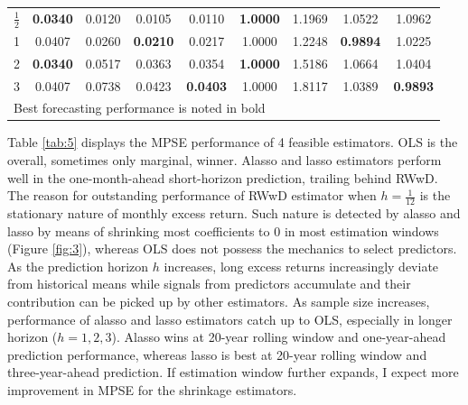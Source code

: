 \documentclass[12pt,a4paper]{article}
\begin{document}
\begin{table}[]
\begin{tabular}{ccccccccc}
\multicolumn{1}{|c|}{$ \frac{1}{2} $}  & \textbf{0.0340} & 0.0120          & 0.0105          & \multicolumn{1}{c|}{0.0110}          & \textbf{1.0000} & 1.1969          & 1.0522          & \multicolumn{1}{c|}{1.0962}          \\
\multicolumn{1}{|c|}{1}                & 0.0407          & 0.0260          & \textbf{0.0210} & \multicolumn{1}{c|}{0.0217}          & 1.0000          & 1.2248          & \textbf{0.9894} & \multicolumn{1}{c|}{1.0225}          \\
\multicolumn{1}{|c|}{2}                & \textbf{0.0340} & 0.0517          & 0.0363          & \multicolumn{1}{c|}{0.0354}          & \textbf{1.0000} & 1.5186          & 1.0664          & \multicolumn{1}{c|}{1.0404}          \\
\multicolumn{1}{|c|}{3}                & 0.0407          & 0.0738          & 0.0423          & \multicolumn{1}{c|}{\textbf{0.0403}} & 1.0000          & 1.8117          & 1.0389          & \multicolumn{1}{c|}{\textbf{0.9893}} \\ \hline
\multicolumn{9}{l}{Best forecasting performance is noted in bold}                                                                                                                                                               
\end{tabular}
\end{table}

Table \ref{tab:5} displays the MPSE performance of 4 feasible estimators. OLS is the overall, sometimes only marginal, winner. Alasso and lasso estimators perform well in the one-month-ahead short-horizon prediction, trailing behind RWwD. The reason for outstanding performance of RWwD estimator when $ h =\frac{1}{12} $ is the stationary nature of monthly excess return. Such nature is detected by alasso and lasso by means of shrinking most coefficients to 0 in most estimation windows (Figure \ref{fig:3}), whereas OLS does not possess the mechanics to select predictors. As the prediction horizon $ h $ increases, long excess returns increasingly deviate from historical means while signals from predictors accumulate and their contribution can be picked up by other estimators. As sample size increases, performance of alasso and lasso estimators catch up to OLS, especially in longer horizon ($ h = 1, 2, 3 $). Alasso wins at 20-year rolling window and one-year-ahead prediction performance, whereas lasso is best at 20-year rolling window and three-year-ahead prediction. If estimation window further expands, I expect more improvement in MPSE for the shrinkage estimators.
\end{document}
